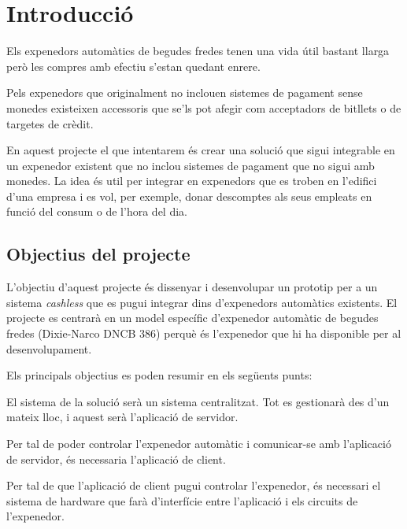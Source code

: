 \chapter{Introducció}

Els expenedors automàtics de begudes fredes tenen una vida útil bastant llarga però les compres amb efectiu s'estan quedant enrere.

Pels expenedors que originalment no inclouen sistemes de pagament sense monedes existeixen accessoris que se'ls pot afegir com acceptadors de bitllets o de targetes de crèdit.

En aquest projecte el que intentarem és crear una solució que sigui integrable en un expenedor existent que no inclou sistemes de pagament que no sigui amb monedes. La idea és util per integrar en expenedors que es troben en l'edifici d'una empresa i es vol, per exemple, donar descomptes als seus empleats en funció del consum o de l'hora del dia.

\section{Objectius del projecte}

L'objectiu d'aquest projecte és dissenyar i desenvolupar un prototip per a un sistema \textit{cashless} que es pugui integrar dins d'expenedors automàtics existents. El projecte es centrarà en un model específic d'expenedor automàtic de begudes fredes (Dixie-Narco DNCB 386\autocite{vender-manual}) perquè és l'expenedor que hi ha disponible per al desenvolupament.

Els principals objectius es poden resumir en els següents punts:

\vspace{-0.5em}
\begin{description}[font=\normalfont\textsl]
\item [Dissenyar i desenvolupar l'aplicació de servidor. ] El sistema de la solució serà un sistema centralitzat. Tot es gestionarà des d'un mateix lloc, i aquest serà l'aplicació de servidor.
\item [Dissenyar i desenvolupar l'aplicació de client. ] Per tal de poder controlar l'expenedor automàtic i comunicar-se amb l'aplicació de servidor, és necessaria l'aplicació de client.
\item [Dissenyar  Desenvolupar el sistema de hardware. ] Per tal de que l'aplicació de client pugui controlar l'expenedor, és necessari el sistema de hardware que farà d'interfície entre l'aplicació i els circuits de l'expenedor.
\end{description}

